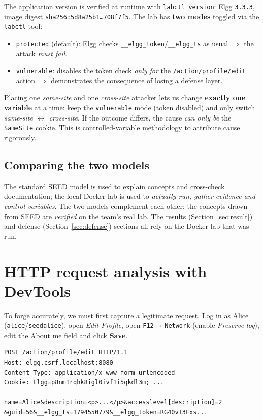 \documentclass[11pt,a4paper]{article}
\begin{document}
\noindent The application version is verified at runtime with \texttt{labctl version}: Elgg \texttt{3.3.3}, image digest \texttt{sha256:5d8a25b1\ldots708f7f5}. The lab has \textbf{two modes} toggled via the \texttt{labctl} tool:
\begin{itemize}
  \item \texttt{protected} (default): Elgg checks \texttt{\_\_elgg\_token}/\texttt{\_\_elgg\_ts} as usual $\Rightarrow$ the attack \emph{must fail}.
  \item \texttt{vulnerable}: disables the token check \emph{only for} the \texttt{/action/profile/edit} action $\Rightarrow$ demonstrates the consequence of losing a defense layer.
\end{itemize}

\begin{infobox}
Placing one \emph{same-site} and one \emph{cross-site} attacker lets us change \textbf{exactly one variable} at a time: keep the \texttt{vulnerable} mode (token disabled) and only switch \emph{same-site $\leftrightarrow$ cross-site}. If the outcome differs, the cause \emph{can only be} the \texttt{SameSite} cookie. This is controlled-variable methodology to attribute cause rigorously.
\end{infobox}

\subsection{Comparing the two models}
The standard SEED model is used to explain concepts and cross-check documentation; the local Docker lab is used to \emph{actually run, gather evidence and control variables}. The two models complement each other: the concepts drawn from SEED are \emph{verified} on the team's real lab. The results (Section~\ref{sec:result}) and defense (Section~\ref{sec:defense}) sections all rely on the Docker lab that was run.

\section{HTTP request analysis with DevTools}
To forge accurately, we must first capture a legitimate request. Log in as Alice (\texttt{alice}/\texttt{seedalice}), open \emph{Edit Profile}, open \texttt{F12 → Network} (enable \emph{Preserve log}), edit the About me field and click \textbf{Save}.

\begin{lstlisting}[style=http,caption={POST request when saving the profile (abridged, from the real lab)}]
POST /action/profile/edit HTTP/1.1
Host: elgg.csrf.localhost:8080
Content-Type: application/x-www-form-urlencoded
Cookie: Elgg=p8nm1rqhk8igl0ivf1i5qkdl3m; ...

name=Alice&description=<p>...</p>&accesslevel[description]=2
&guid=56&__elgg_ts=1794550779&__elgg_token=RG40vT3Fxs...
\end{lstlisting}
\end{document}

